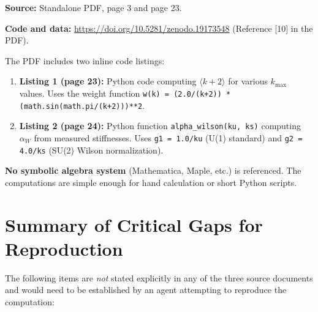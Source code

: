 \documentclass[12pt,a4paper]{article}
\begin{document}
\begin{tcolorbox}[colback=yellow!5!white, colframe=yellow!50!black,
  title=Answer: YES --- Zenodo code repository explicitly referenced]

\textbf{Source:} Standalone PDF, page 3 and page 23.

\textbf{Code and data:} \url{https://doi.org/10.5281/zenodo.19173548}
(Reference [10] in the PDF).

The PDF includes two inline code listings:
\begin{enumerate}
\item \textbf{Listing 1 (page 23):} Python code computing
  $\langle k+2 \rangle$ for various $k_{\max}$ values.  Uses the weight
  function \texttt{w(k) = (2.0/(k+2)) * (math.sin(math.pi/(k+2)))**2}.
\item \textbf{Listing 2 (page 24):} Python function
  \texttt{alpha\_wilson(ku, ks)} computing $\alpha_W$ from measured
  stiffnesses.  Uses \texttt{g1 = 1.0/ku} (U(1) standard) and
  \texttt{g2 = 4.0/ks} (SU(2) Wilson normalization).
\end{enumerate}

\textbf{No symbolic algebra system} (Mathematica, Maple, etc.) is
referenced.  The computations are simple enough for hand calculation
or short Python scripts.
\end{tcolorbox}

\section{Summary of Critical Gaps for Reproduction}
\label{sec:gaps}

The following items are \emph{not} stated explicitly in any of the three
source documents and would need to be established by an agent attempting
to reproduce the computation:
\end{document}

